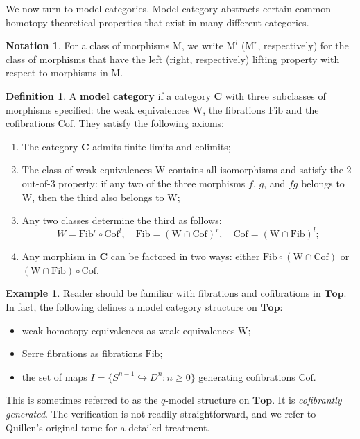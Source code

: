 \documentclass[psamsfonts]{amsart}
\theoremstyle{definition}
\newtheorem{defn}{Definition}[section]
\newtheorem{exmp}{Example}[section]
\newtheorem{notn}{Notation}[section]
\newcommand{\Top}{\mathbf{Top}}
\newcommand{\W}{\mathrm{W}}
\newcommand{\Fib}{\mathrm{Fib}}
\newcommand{\Cof}{\mathrm{Cof}}
\numberwithin{equation}{section}
\begin{document}
We now turn to model categories. Model category abstracts certain common homotopy-theoretical properties that exist in many different categories.

\begin{notn}
For a class of morphisms $\mathrm{M}$, we write $\mathrm{M}^l$ ($\mathrm{M}^r$, respectively) for the class of morphisms that have the left (right, respectively) lifting property with respect to morphisms in $\mathrm{M}$.
\end{notn}

\begin{defn}
A \textbf{model category} if a category $\mathbf{C}$ with three subclasses of morphisms specified: the weak equivalences $\W$, the fibrations $\Fib$ and the cofibrations $\Cof$. They satisfy the following axioms:\begin{enumerate}[(M1)]
    \item The category $\mathbf{C}$ admits finite limits and colimits;
    \item The class of weak equivalences $\W$ contains all isomorphisms and satisfy the 2-out-of-3 property: if any two of the three morphisms $f$, $g$, and $fg$ belongs to $\W$, then the third also belongs to $\W$;
    \item Any two classes determine the third as follows:
    \[W=\Fib^r\circ\Cof^l,\quad\Fib=(\W\cap\Cof)^r,\quad\Cof=(\W\cap\Fib)^l;\]
    \item Any morphism in $\mathbf{C}$ can be factored in two ways: either $\Fib\circ(\W\cap\Cof)$ or $(\W\cap\Fib)\circ\Cof$.
\end{enumerate}
\end{defn}

\begin{exmp}
Reader should be familiar with fibrations and cofibrations in $\Top$. In fact, the following defines a model category structure on $\Top$:\begin{itemize}
    \item weak homotopy equivalences as weak equivalences $\W$;
    \item Serre fibrations as fibrations $\Fib$;
    \item the set of maps $I=\{S^{n-1}\hookrightarrow D^n:n\geq0\}$ generating cofibrations $\Cof$.
\end{itemize}
This is sometimes referred to as the $q$-model structure on $\Top$. It is \textit{cofibrantly generated}. The verification is not readily straightforward, and we refer to Quillen's original tome \cite{Quillen1} for a detailed treatment.
\end{exmp}
\end{document}
